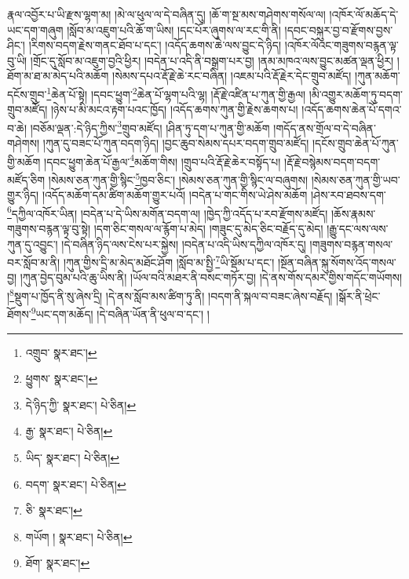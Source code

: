 རྣལ་འབྱོར་པ་ཡི་རྫས་ལྷག་མ། །མེ་ལ་ཕུལ་ལ་དེ་བཞིན་དུ། །ཆོ་ག་སྔ་མས་གཤེགས་གསོལ་ལ། །འཁོར་ལོ་མཆོད་དེ་ཡང་དག་གཞུག །སློབ་མ་འཇུག་པའི་ཆོ་ག་ཡིས། །དང་པོར་ཞུགས་ལ་རང་གི་ནི། །དབང་བསྐུར་བྱ་བ་རྫོགས་བྱས་ཤིང་། །རིགས་བདག་རྗེས་གནང་ཐོབ་པ་དང་། །འདོད་ཆགས་ཆེ་ལས་བྱུང་དེ་ཉིད། །འཁོར་ལོའང་གཟུགས་བརྙན་ལྟ་བུ་ཡི། །གྲོང་དུ་སློབ་མ་འཇུག་བྱའི་ཕྱིར། །བདེན་པ་འདི་ནི་བསྒྲག་པར་བྱ། །ནམ་མཁའ་ལས་བྱུང་མཚན་ལྡན་ཕྱིར། །ཐོག་མ་ཐ་མ་མེད་པའི་མཆོག །སེམས་དཔའ་རྡོ་རྗེ་ཆེ་རང་བཞིན། །འཇམ་པའི་རྡོ་རྗེར་དེང་གྲུབ་མཛོད། །ཀུན་མཆོག་དངོས་གྲུབ་\footnote{འགྲུབ་  སྣར་ཐང་། }ཆེན་པོ་སྟེ། །དབང་ཕྱུག་\footnote{ཕྱུགས་  སྣར་ཐང་། }ཆེན་པོ་ལྷག་པའི་ལྷ། །རྡོ་རྗེ་འཛིན་པ་ཀུན་གྱི་རྒྱལ། །མི་འགྱུར་མཆོག་ཏུ་བདག་གྲུབ་མཛོད། །ཉེས་པ་མི་མངའ་རྟག་པའང་ཁྱོད། །འདོད་ཆགས་ཀུན་གྱི་རྗེས་ཆགས་པ། །འདོད་ཆགས་ཆེན་པོ་དགའ་བ་ཆེ། །བཅོམ་ལྡན་:དེ་ཉིད་ཀྱིས་\footnote{དེ་ཉིད་ཀྱི་  སྣར་ཐང་།  པེ་ཅིན། }གྲུབ་མཛོད། །ཤིན་ཏུ་དག་པ་ཀུན་གྱི་མཆོག །གདོད་ནས་གྲོལ་བ་དེ་བཞིན་གཤེགས། །ཀུན་དུ་བཟང་པོ་ཀུན་བདག་ཉིད། །བྱང་ཆུབ་སེམས་དཔར་བདག་གྲུབ་མཛོད། །དངོས་གྲུབ་ཆེན་པོ་ཀུན་གྱི་མཆོག །དབང་ཕྱུག་ཆེན་པོ་རྒྱལ་\footnote{རྒྱ་  སྣར་ཐང་།  པེ་ཅིན། }མཆོག་གིས། །གྲུབ་པའི་རྡོ་རྗེ་ཆེར་བསྟོད་པ། །རྡོ་རྗེ་བསྙེམས་བདག་བདག་མཛོད་ཅིག །སེམས་ཅན་ཀུན་གྱི་སྙིང་\footnote{ཡིད་  སྣར་ཐང་།  པེ་ཅིན། }ཁྱབ་ཅིང་། །སེམས་ཅན་ཀུན་གྱི་སྙིང་ལ་བཞུགས། །སེམས་ཅན་ཀུན་གྱི་ཡབ་གྱུར་ཉིད། །འདོད་མཆོག་དམ་ཚིག་མཆོག་གྱུར་པའོ། །བདེན་པ་གང་གིས་ཡེ་ཤེས་མཆོག །ཤེས་རབ་ཐབས་དག་\footnote{བདག་  སྣར་ཐང་།  པེ་ཅིན། }དཀྱིལ་འཁོར་ཡིན། །བདེན་པ་དེ་ཡིས་མགོན་བདག་ལ། །ཁྱེད་ཀྱི་འདོད་པ་རབ་རྫོགས་མཛོད། །ཆོས་རྣམས་གཟུགས་བརྙན་ལྟ་བུ་སྟེ། །དག་ཅིང་གསལ་ལ་རྙོག་པ་མེད། །གཟུང་དུ་མེད་ཅིང་བརྗོད་དུ་མེད། །རྒྱུ་དང་ལས་ལས་ཀུན་དུ་འབྱུང་། །དེ་བཞིན་ཉིད་ལས་ངེས་པར་སྐྱེས། །བདེན་པ་འདི་ཡིས་དཀྱིལ་འཁོར་དུ། །གཟུགས་བརྙན་གསལ་བར་སློབ་མ་ནི། །ཀུན་གྱིས་དྲི་མ་མེད་མཐོང་ཤོག །སློབ་མ་སྤྱི་\footnote{ཅི་  སྣར་ཐང་། }ཡི་སྡོམ་པ་དང་། །སྔོན་བཞིན་སྐུ་སོགས་འོད་གསལ་བྱ། །ཀུན་བྱེད་བུམ་པའི་ཆུ་ཡིས་ནི། །ཡོལ་བའི་མཐར་ནི་བསང་གཏོར་བྱ། །དེ་ནས་གོས་དམར་གྱིས་གདོང་གཡོགས། །\footnote{གཡོག །  སྣར་ཐང་།  པེ་ཅིན། }སྡུག་པ་ཁྱོད་ནི་སུ་ཞེས་དྲི། །དེ་ནས་སློབ་མས་ཚིག་ཏུ་ནི། །བདག་ནི་སྐལ་བ་བཟང་ཞེས་བརྗོད། །སྒོར་ནི་ཕྲེང་ཐོགས་\footnote{ཐོག་  སྣར་ཐང་། }ཡང་དག་མཆོད། །དེ་བཞིན་ཡོན་ནི་ཕུལ་བ་དང་། །
